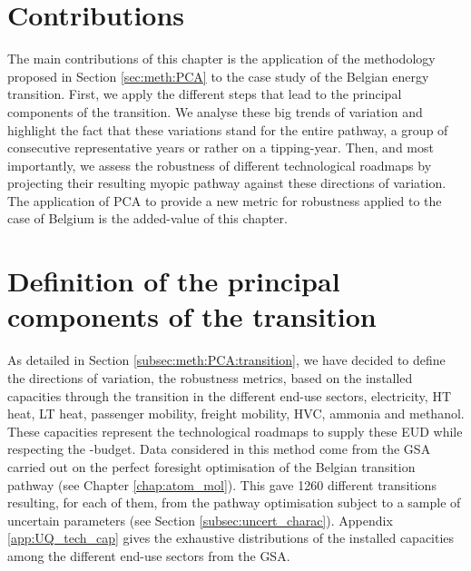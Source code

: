 \section*{Contributions}
\label{sec:RobPol:contributions}
The main contributions of this chapter is the application of the methodology proposed in Section \ref{sec:meth:PCA} to the case study of the Belgian energy transition. First, we apply the different steps that lead to the principal components of the transition. We analyse these big trends of variation and highlight the fact that these variations stand for the entire pathway, a group of consecutive representative years or rather on a tipping-year. Then, and most importantly, we assess the robustness of different technological roadmaps by projecting their resulting myopic pathway against these directions of variation. The application of \gls{PCA} to provide a new metric for robustness applied to the case of Belgium is the added-value of this chapter.

\section{Definition of the principal components of the transition}
\label{sec:RobPol:PC_transition}
As detailed in Section \ref{subsec:meth:PCA:transition}, we have decided to define the directions of variation, \ie the robustness metrics, based on the installed capacities through the transition in the different end-use sectors, \ie electricity, \gls{HT} heat, \gls{LT} heat, passenger mobility, freight mobility, \gls{HVC}, ammonia and methanol. These capacities represent the technological roadmaps to supply these \gls{EUD} while respecting the -budget.  Data considered in this method come from the \gls{GSA} carried out on the perfect foresight optimisation of the Belgian transition pathway (see Chapter \ref{chap:atom_mol}). This gave 1260 different transitions resulting, for each of them, from the pathway optimisation subject to a sample of uncertain parameters (see Section \ref{subsec:uncert_charac}). Appendix \ref{app:UQ_tech_cap} gives the exhaustive distributions of the installed capacities among the different end-use sectors from the \gls{GSA}.

